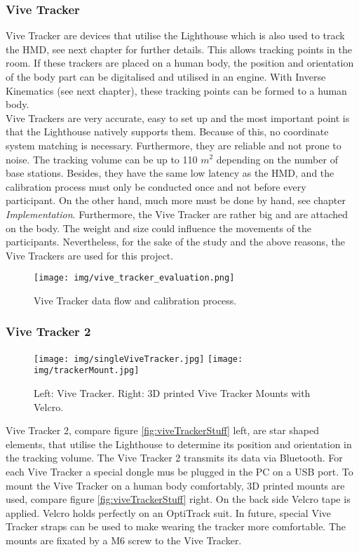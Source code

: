 \subsubsection{Vive Tracker}
Vive Tracker are devices that utilise the Lighthouse which is also used to track the HMD, see next chapter for further details. This allows tracking points in the room. If these trackers are placed on a human body, the position and orientation of the body part can be digitalised and utilised in an engine. With Inverse Kinematics (see next chapter), these tracking points can be formed to a human body.\\
Vive Trackers are very accurate, easy to set up and the most important point is that the Lighthouse natively supports them. Because of this, no coordinate system matching is necessary. Furthermore, they are reliable and not prone to noise. The tracking volume can be up to 110 $m^2$ depending on the number of base stations. Besides, they have the same low latency as the HMD, and the calibration process must only be conducted once and not before every participant. On the other hand, much more must be done by hand, see chapter \textit{Implementation}. Furthermore, the Vive Tracker are rather big and are attached on the body. The weight and size could influence the movements of the participants. Nevertheless, for the sake of the study and the above reasons, the Vive Trackers are used for this project.
\begin{figure}
	\centering
	\texttt{[image: img/vive\_tracker\_evaluation.png]}
	\caption{Vive Tracker data flow and calibration process.}
	\label{fig:viveTrackerCalibration}
\end{figure}

\subsubsection{Vive Tracker 2}
\begin{figure}
	\centering
	\texttt{[image: img/singleViveTracker.jpg]}
	\texttt{[image: img/trackerMount.jpg]}
	\caption{Left: Vive Tracker. Right: 3D printed Vive Tracker Mounts with Velcro.}
	\label{fig:viveTrackerStuff}
	\label{fig:singleViveTracker}
\end{figure}
Vive Tracker 2, compare figure \ref{fig:viveTrackerStuff} left, are star shaped elements, that utilise the Lighthouse to determine its position and orientation in the tracking volume. The Vive Tracker 2 transmits its data via Bluetooth. For each Vive Tracker a special dongle mus be plugged in the PC on a USB port. To mount the Vive Tracker on a human body comfortably, 3D printed mounts are used, compare figure \ref{fig:viveTrackerStuff} right. On the back side Velcro tape is applied. Velcro holds perfectly on an OptiTrack suit. In future, special Vive Tracker straps can be used to make wearing the tracker more comfortable. The mounts are fixated by a M6 screw to the Vive Tracker.

